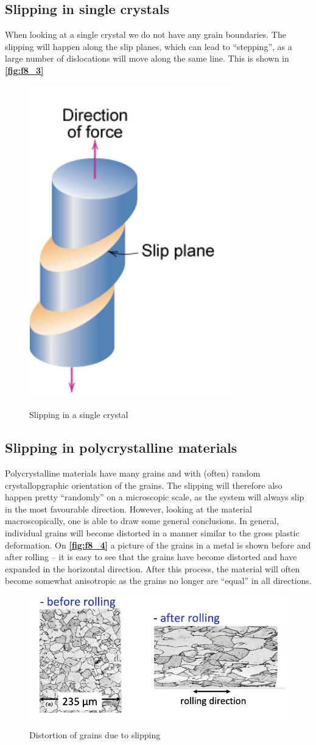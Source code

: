 \subsection{Slipping in single crystals}
When looking at a single crystal we do not have any grain boundaries. The slipping will happen along the slip planes, which can lead to ``stepping'', as a large number of dislocations will move along the same line. This is shown in \textbf{\autoref{fig:f8_3}}

\begin{figure} [ht]
  \centering
  \caption{Slipping in a single crystal}
  \includegraphics[width=0.25\linewidth]{./figures/f8_3.png}
  \label{fig:f8_3}
\end{figure}

\subsection{Slipping in polycrystalline materials}
Polycrystalline materials have many grains and with (often) random crystallopgraphic orientation of the grains. The slipping will therefore also happen pretty ``randomly'' on a microscopic scale, as the system will always slip in the most favourable direction. However, looking at the material macroscopically, one is able to draw some general conclusions. In general, individual grains will become distorted in a manner similar to the gross plastic deformation. On \textbf{\autoref{fig:f8_4}} a picture of the grains in a metal is shown before and after rolling -- it is easy to see that the grains have become distorted and have expanded in the horizontal direction. After this process, the material will often become somewhat anisotropic as the grains no longer are ``equal'' in all directions.

\begin{figure} [ht]
  \centering
  \caption{Distortion of grains due to slipping}
  \includegraphics[width=0.6\linewidth]{./figures/f8_4.png}
  \label{fig:f8_4}
\end{figure}

